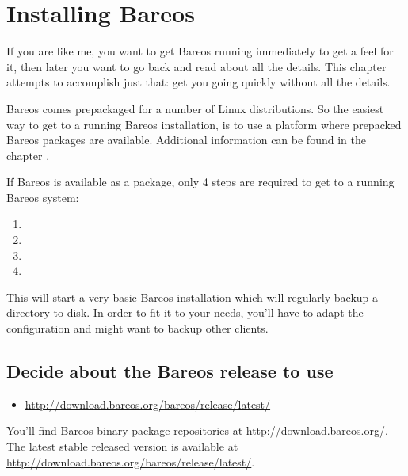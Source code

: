 \chapter{Installing Bareos}
\label{InstallChapter}

If you are like me, you want to get Bareos running immediately to get a feel
for it, then later you want to go back and read about all the details. This
chapter attempts to accomplish just that: get you going quickly without all
the details.

Bareos comes prepackaged for a number of Linux distributions.
So the easiest way to get to a running Bareos installation, 
is to use a platform where prepacked Bareos packages are available.
Additional information can be found in the chapter .


If Bareos is available as a package, 
only 4 steps are required to get to a running Bareos system:
\begin{enumerate}
    \item {}
    \item {}
    \item {}
    \item {}
\end{enumerate}

This will start a very basic Bareos installation which will regularly backup a directory to disk.
In order to fit it to your needs, you'll have to adapt the configuration and might want to backup other clients.

\section{Decide about the Bareos release to use}
    \label{sec:AddSoftwareRepository}

\begin{itemize}
   \item \url{http://download.bareos.org/bareos/release/latest/}
\end{itemize}

You'll find Bareos binary package repositories at \url{http://download.bareos.org/}.
The latest stable released version is available at \url{http://download.bareos.org/bareos/release/latest/}.

